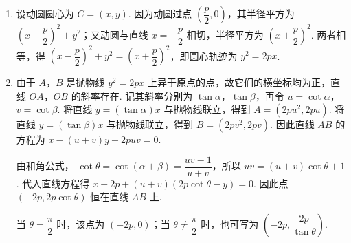 \begin{solution}
\begin{enumerate}
\item
设动圆圆心为 \(C=(x,y)\). 因为动圆过点 \(\left(\dfrac{p}{2},0\right)\)，其半径平方为
\(\left(x-\dfrac{p}{2}\right)^2+y^2\)；又动圆与直线 \(x=-\dfrac{p}{2}\) 相切，半径平方为 \(\left(x+\dfrac{p}{2}\right)^2\). 两者相等，得
\(\left(x-\dfrac{p}{2}\right)^2+y^2=\left(x+\dfrac{p}{2}\right)^2\)，即圆心轨迹为 \(y^2=2px\).

\item
由于 \(A\)，\(B\) 是抛物线 \(y^2=2px\) 上异于原点的点，故它们的横坐标均为正，直线 \(OA\)，\(OB\) 的斜率存在. 记其斜率分别为 \(\tan\alpha\)，\(\tan\beta\)，再令 \(u=\cot\alpha\)，\(v=\cot\beta\). 将直线 \(y=(\tan\alpha)x\) 与抛物线联立，得到
\(A=(2pu^2,2pu)\). 将直线 \(y=(\tan\beta)x\) 与抛物线联立，得到 \(B=(2pv^2,2pv)\). 因此直线 \(AB\) 的方程为
\(x-(u+v)y+2puv=0\).

由和角公式，
\(\cot\theta=\cot(\alpha+\beta)=\dfrac{uv-1}{u+v}\)，所以 \(uv=(u+v)\cot\theta+1\). 代入直线方程得
\(x+2p+(u+v)(2p\cot\theta-y)=0\). 因此点
\(\left(-2p,2p\cot\theta\right)\) 恒在直线 \(AB\) 上.

当 \(\theta=\dfrac{\pi}{2}\) 时，该点为 \((-2p,0)\)；当 \(\theta\neq\dfrac{\pi}{2}\) 时，也可写为 \(\left(-2p,\dfrac{2p}{\tan\theta}\right)\).
\end{enumerate}
\end{solution}
